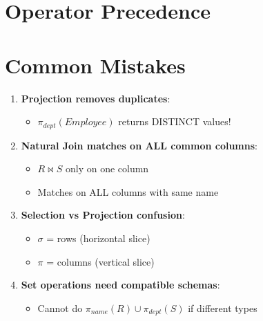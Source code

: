 \section{Operator Precedence}

\begin{center}
\end{center}

\section{Common Mistakes}

\begin{warningbox}
\begin{enumerate}
    \item \textbf{Projection removes duplicates}:
    \begin{itemize}
        \item $\pi_{dept}(Employee)$ returns DISTINCT values!
    \end{itemize}

    \item \textbf{Natural Join matches on ALL common columns}:
    \begin{itemize}
        \item[$\times$] $R \bowtie S$ only on one column
        \item[\checkmark] Matches on ALL columns with same name
    \end{itemize}

    \item \textbf{Selection vs Projection confusion}:
    \begin{itemize}
        \item $\sigma$ = rows (horizontal slice)
        \item $\pi$ = columns (vertical slice)
    \end{itemize}

    \item \textbf{Set operations need compatible schemas}:
    \begin{itemize}
        \item Cannot do $\pi_{name}(R) \cup \pi_{dept}(S)$ if different types
    \end{itemize}
\end{enumerate}
\end{warningbox}

